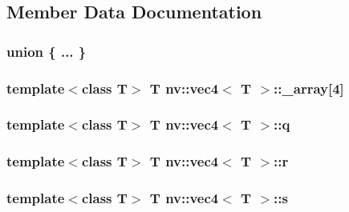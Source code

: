 \subsection{Member Data Documentation}
\hypertarget{classnv_1_1vec4_0a4b52c987431d28ab17a5063882bf77}{
\subsubsection[{"@19}]{\setlength{\rightskip}{0pt plus 5cm}union \{ ... \} }}
\label{classnv_1_1vec4_0a4b52c987431d28ab17a5063882bf77}


\hypertarget{classnv_1_1vec4_2f9eb49f9af13e0b49d6ec80f54d4c02}{
\subsubsection[{\_\-array}]{\setlength{\rightskip}{0pt plus 5cm}template$<$class T$>$ T {\bf nv::vec4}$<$ T $>$::{\bf \_\-array}\mbox{[}4\mbox{]}}}
\label{classnv_1_1vec4_2f9eb49f9af13e0b49d6ec80f54d4c02}


\hypertarget{classnv_1_1vec4_f4f30562ea083784e6c95c3564c70d88}{
\subsubsection[{q}]{\setlength{\rightskip}{0pt plus 5cm}template$<$class T$>$ T {\bf nv::vec4}$<$ T $>$::{\bf q}}}
\label{classnv_1_1vec4_f4f30562ea083784e6c95c3564c70d88}


\hypertarget{classnv_1_1vec4_cce02b228d7245e9bf9ab0a8a94e842a}{
\subsubsection[{r}]{\setlength{\rightskip}{0pt plus 5cm}template$<$class T$>$ T {\bf nv::vec4}$<$ T $>$::{\bf r}}}
\label{classnv_1_1vec4_cce02b228d7245e9bf9ab0a8a94e842a}


\hypertarget{classnv_1_1vec4_63a10222748073bb3824bf8e3938a956}{
\subsubsection[{s}]{\setlength{\rightskip}{0pt plus 5cm}template$<$class T$>$ T {\bf nv::vec4}$<$ T $>$::{\bf s}}}
\label{classnv_1_1vec4_63a10222748073bb3824bf8e3938a956}


